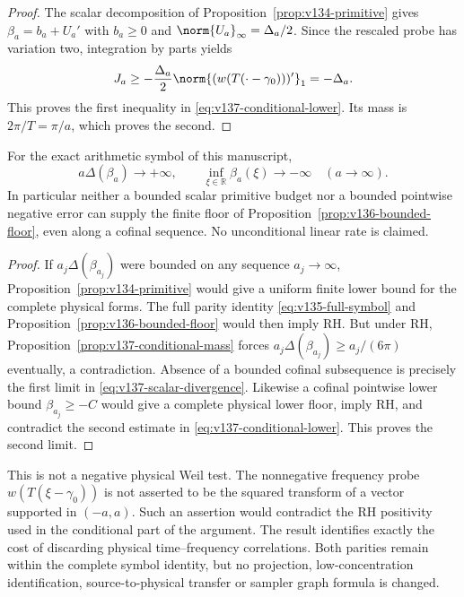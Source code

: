 \begin{proof}
The scalar decomposition of Proposition~\ref{prop:v134-primitive}
gives $\beta_a=b_a+U_a'$ with $b_a\ge0$ and
$\norm{U_a}_\infty=\Delta_a/2$. Since the rescaled probe has variation
two, integration by parts yields
\[
 J_a\ge-\frac{\Delta_a}{2}
      \norm{(w(T(\cdot-\gamma_0)))'}_1=-\Delta_a.
\]
This proves the first inequality in \eqref{eq:v137-conditional-lower}.
Its mass is $2\pi/T=\pi/a$, which proves the second.
\end{proof}

\begin{corollary}
\label{cor:v137-scalar-no-go}
For the exact arithmetic symbol of this manuscript,
\begin{equation}\label{eq:v137-scalar-divergence}
 a\Delta(\beta_a)\longrightarrow+\infty,
 \qquad
 \inf_{\xi\in\mathbb R}\beta_a(\xi)\longrightarrow-\infty
 \quad(a\longrightarrow\infty).
\end{equation}
In particular neither a bounded scalar primitive budget nor a bounded
pointwise negative error can supply the finite floor of
Proposition~\ref{prop:v136-bounded-floor}, even along a cofinal sequence.
No unconditional linear rate is claimed.
\end{corollary}
\begin{proof}
If $a_j\Delta(\beta_{a_j})$ were bounded on any sequence
$a_j\to\infty$, Proposition~\ref{prop:v134-primitive} would give a
uniform finite lower bound for the complete physical forms. The full
parity identity \eqref{eq:v135-full-symbol} and
Proposition~\ref{prop:v136-bounded-floor} would then imply RH.
But under RH, Proposition~\ref{prop:v137-conditional-mass} forces
$a_j\Delta(\beta_{a_j})\ge a_j/(6\pi)$ eventually, a contradiction.
Absence of a bounded cofinal subsequence is precisely the first limit
in \eqref{eq:v137-scalar-divergence}.
Likewise a cofinal pointwise lower bound $\beta_{a_j}\ge-C$ would
give a complete physical lower floor, imply RH, and contradict the
second estimate in \eqref{eq:v137-conditional-lower}.
This proves the second limit.
\end{proof}

This is not a negative physical Weil test. The nonnegative frequency
probe $w(T(\xi-\gamma_0))$ is not asserted to be the squared transform
of a vector supported in $(-a,a)$. Such an assertion would contradict
the RH positivity used in the conditional part of the argument.
The result identifies exactly the cost of discarding physical
time--frequency correlations. Both parities remain within the complete
symbol identity, but no projection, low-concentration identification,
source-to-physical transfer or sampler graph formula is changed.

